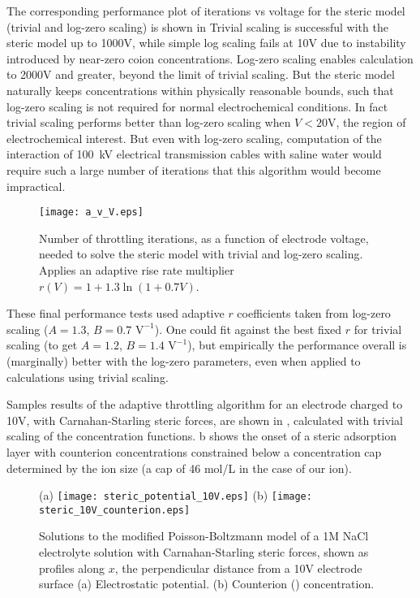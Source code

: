 The corresponding
performance plot of iterations vs voltage for the steric model
(trivial and log-zero scaling) is shown in 
Trivial scaling is successful with the steric model up to 1000V, while simple log
scaling fails at 10V due to instability introduced by near-zero coion
concentrations.
Log-zero scaling enables calculation to 2000V
and greater, beyond the limit of trivial scaling. But the steric model
naturally keeps concentrations within 
physically reasonable bounds, such that  log-zero scaling is not
required for normal electrochemical conditions. In fact
trivial scaling performs better than log-zero scaling when $V<20$V,
the region of electrochemical interest.
But even with log-zero scaling, computation of the interaction of
100~kV electrical transmission cables with saline water would require
such a large number of iterations that this algorithm would become impractical.

\begin{figure}
\centering
\texttt{[image: a\_v\_V.eps]}
\caption{Number of throttling iterations,  as a function of electrode
  voltage, needed to solve the steric model with trivial and log-zero scaling.
  Applies an adaptive rise rate multiplier $r(V)=1+1.3\ln(1+0.7V)$.
}
\label{fig:convergence}
\end{figure}

These final performance tests used adaptive $r$ coefficients taken from log-zero scaling ($A=1.3$,
$B=0.7 \textrm{ V}^{-1}$). One could fit against the best fixed  $r$ for trivial
scaling (to get $A=1.2$, $B=1.4 \textrm{ V}^{-1}$), but empirically
the performance overall is (marginally) better with the log-zero
parameters, even when applied to calculations using trivial scaling.




Samples results of the adaptive throttling algorithm for an electrode charged to
10V, with Carnahan-Starling steric forces, are shown in
, calculated with trivial scaling of the
concentration functions. b shows the onset
of a steric adsorption layer \cite{DagmawiParsons2022} with counterion
concentrations constrained below a concentration cap determined by the
ion size (a cap of 46 mol/L in the case of our  ion).

\begin{figure}
\centering
(a)
\texttt{[image: steric\_potential\_10V.eps]}
(b)
\texttt{[image: steric\_10V\_counterion.eps]}
\caption{\label{fig_results_throttling}Solutions to the modified
  Poisson-Boltzmann model of a 1M NaCl electrolyte solution with
  Carnahan-Starling steric forces, shown as profiles along $x$, the
  perpendicular distance from a 10V electrode surface (a) Electrostatic
  potential. (b) Counterion () concentration. }
\end{figure}

